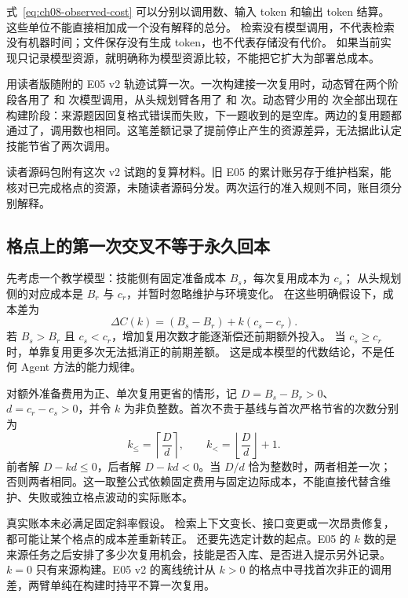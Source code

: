 式~\ref{eq:ch08-observed-cost} 可以分别以调用数、输入 token 和输出 token 结算。
这些单位不能直接相加成一个没有解释的总分。
检索没有模型调用，不代表检索没有机器时间；文件保存没有生成 token，也不代表存储没有代价。
如果当前实现只记录模型资源，就明确称为模型资源比较，不能把它扩大为部署总成本。

用读者版随附的 E05 v2 轨迹试算一次。一次构建接一次复用时，动态臂在两个阶段各用了  和  次模型调用，从头规划臂各用了  和  次。动态臂少用的  次全部出现在构建阶段：来源题因回复格式错误而失败，下一题收到的是空库。两边的复用题都通过了，调用数也相同。这笔差额记录了提前停止产生的资源差异，无法据此认定技能节省了两次调用。

读者源码包附有这次 v2 试跑的复算材料。旧 E05 的累计账另存于维护档案，能核对已完成格点的资源，未随读者源码分发。两次运行的准入规则不同，账目须分别解释。

\subsection{格点上的第一次交叉不等于永久回本}

先考虑一个教学模型：技能侧有固定准备成本 $B_s$，每次复用成本为 $c_s$；
从头规划侧的对应成本是 $B_r$ 与 $c_r$，并暂时忽略维护与环境变化。
在这些明确假设下，成本差为
\begin{equation}
 \Delta C(k)=(B_s-B_r)+k(c_s-c_r).
\end{equation}
若 $B_s>B_r$ 且 $c_s<c_r$，增加复用次数才能逐渐偿还前期额外投入。
当 $c_s\ge c_r$ 时，单靠复用更多次无法抵消正的前期差额。
这是成本模型的代数结论，不是任何 Agent 方法的能力规律。

对额外准备费用为正、单次复用更省的情形，记 $D=B_s-B_r>0$、$d=c_r-c_s>0$，并令 $k$ 为非负整数。首次不贵于基线与首次严格节省的次数分别为
\begin{equation}
 k_{\le}=\left\lceil\frac{D}{d}\right\rceil,\qquad
 k_{<}=\left\lfloor\frac{D}{d}\right\rfloor+1.
 \label{eq:ch08-integer-threshold}
\end{equation}
前者解 $D-kd\le0$，后者解 $D-kd<0$。当 $D/d$ 恰为整数时，两者相差一次；否则两者相同。这一取整公式依赖固定费用与固定边际成本，不能直接代替含维护、失败或独立格点波动的实际账本。

真实账本未必满足固定斜率假设。
检索上下文变长、接口变更或一次昂贵修复，都可能让某个格点的成本差重新转正。
还要先选定计数的起点。E05 的 $k$ 数的是来源任务之后安排了多少次复用机会，技能是否入库、是否进入提示另外记录。$k=0$ 只有来源构建。E05 v2 的离线统计从 $k>0$ 的格点中寻找首次非正的调用差，两臂单纯在构建时持平不算一次复用。

